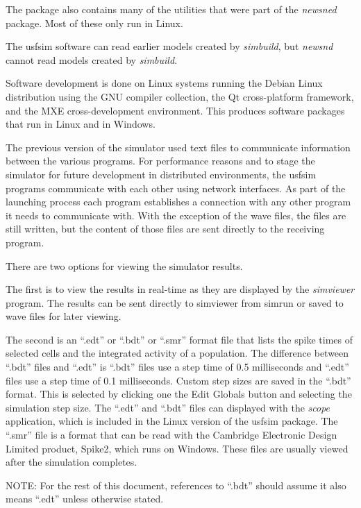 \documentclass[12pt,openany,oneside]{book}
\newcommand{\prog}[1]{\textit{{#1}}}
\newcommand{\ext}[1]{{{``.#1''}}}
\begin{document}
The package also contains many of the utilities that were part 
of the \prog{newsned} package. Most of these only run in Linux.

The usfsim software can read earlier models created by \prog{simbuild},
but \prog{newsnd} cannot read models created by \prog{simbuild}.

Software development is done on Linux  systems running the
Debian Linux distribution using the GNU compiler collection, the Qt
cross-platform framework, and the MXE cross-development environment. This
produces software packages that run in Linux and in Windows.

The previous version of the simulator used text files to communicate
information between the various programs. For performance reasons and to
stage the simulator for future development in distributed environments,
the usfsim programs communicate with each other using network interfaces.
As part of the launching process each program establishes a connection
with any other program it needs to communicate with. With the exception
of the wave files, the files are still written, but the content of those
files are sent directly to the receiving program.

There are two options for viewing the simulator results.

The first is to view the results in real-time as they are displayed
by the \prog{simviewer} program. The results can be sent directly to simviewer
from simrun or saved to wave files for later viewing.

The second is an \ext{edt} or \ext{bdt} or \ext{smr} format file that
lists the spike times of selected cells and the integrated activity of a
population. The difference between \ext{bdt} files and \ext{edt} is
\ext{bdt} files use a step time of 0.5 milliseconds and \ext{edt} files
use a step time of 0.1 milliseconds. Custom step sizes are saved in the
\ext{bdt} format. This is selected by clicking one the Edit Globals button
and selecting the simulation step size. The \ext{edt} and \ext{bdt} files
can displayed with the \prog{scope} application, which is included in the
Linux version of the usfsim package. The \ext{smr} file is a format that
can be read with the Cambridge Electronic Design Limited product, Spike2,
which runs on Windows. These files are usually viewed after the simulation
completes.

NOTE: For the rest of this document, references to \ext{bdt} should assume
it also means \ext{edt} unless otherwise stated.
\end{document}
